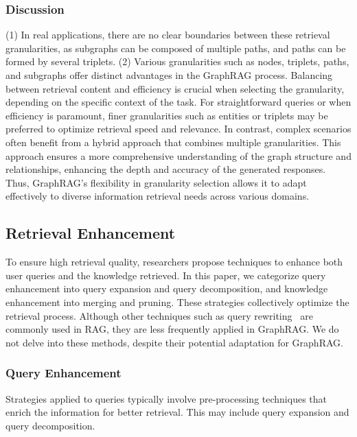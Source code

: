 \documentclass[acmsmall]{acmart}
\begin{document}
\subsubsection{Discussion} (1) In real applications, there are no clear boundaries between these retrieval granularities, as subgraphs can be composed of multiple paths, and paths can be formed by several triplets. (2) Various granularities such as nodes, triplets, paths, and subgraphs offer distinct advantages in the GraphRAG process. Balancing between retrieval content and efficiency is crucial when selecting the granularity, depending on the specific context of the task. For straightforward queries or when efficiency is paramount, finer granularities such as entities or triplets may be preferred to optimize retrieval speed and relevance. In contrast, complex scenarios often benefit from a hybrid approach that combines multiple granularities. This approach ensures a more comprehensive understanding of the graph structure and relationships, enhancing the depth and accuracy of the generated responses. Thus, GraphRAG's flexibility in granularity selection allows it to adapt effectively to diverse information retrieval needs across various domains.

\subsection{Retrieval Enhancement}
To ensure high retrieval quality, researchers propose techniques to enhance both user queries and the knowledge retrieved. In this paper, we categorize query enhancement into query expansion and query decomposition, and knowledge enhancement into merging and pruning. These strategies collectively optimize the retrieval process. Although other techniques such as query rewriting~\cite{ref:rewrite1,ref:rewrite2,ref:rewrite3,ref:rewrite4} are commonly used in RAG, they are less frequently applied in GraphRAG. We do not delve into these methods, despite their potential adaptation for GraphRAG.

\subsubsection{Query Enhancement} 
Strategies applied to queries typically involve pre-processing techniques that enrich the information for better retrieval. This may include query expansion and query decomposition. 
\end{document}
